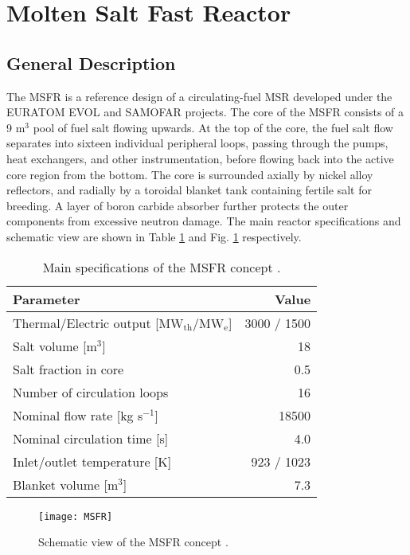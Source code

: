 \section{Molten Salt Fast Reactor}

\subsection{General Description}

The \gls{MSFR} is a reference design of a circulating-fuel \gls{MSR} developed
under the EURATOM \gls{EVOL} and \gls{SAMOFAR} projects. The core of the
\gls{MSFR} consists of a 9 m$^3$ pool of fuel salt flowing upwards. At the top
of the core, the fuel salt flow separates into sixteen individual peripheral
loops, passing through the pumps, heat exchangers, and other instrumentation,
before flowing back into the active core region from the bottom. The core is
surrounded axially by nickel alloy reflectors, and radially by a toroidal
blanket tank containing fertile salt for
breeding. A layer of boron carbide absorber further protects the outer
components from excessive neutron damage. The main reactor specifications and
schematic view are shown in Table \ref{table:msfr} and Fig. \ref{fig:msfr}
respectively. 

\begin{table}[h]
	\caption{Main specifications of the \gls{MSFR} concept
				\cite{serp_molten_2014}.}
	\centering
	\begin{tabular}{ l r }
		\hline
		Parameter & Value \\
		\hline
		Thermal/Electric output [MW$_{\text{th}}$/MW$_{\text{e}}$] & 3000 /
		1500 
		\\
		Salt volume [m$^3$] & 18 \\
		Salt fraction in core & 0.5 \\
		Number of circulation loops & 16 \\
		Nominal flow rate [kg s$^{-1}$] & 18500  \\
		Nominal circulation time [s] & 4.0 \\
		Inlet/outlet temperature [K] & 923 / 1023 \\
		Blanket volume [m$^3$] & 7.3\\
		\hline
	\end{tabular}
	\label{table:msfr}
\end{table}

\begin{figure}[h] 
	\centering
	\texttt{[image: MSFR]}
	\caption{Schematic view of the MSFR concept \cite{serp_molten_2014}.}
	\label{fig:msfr}
\end{figure}

